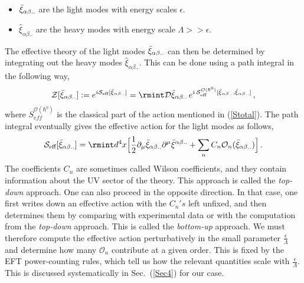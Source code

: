 \begin{itemize}
    \item $\Bar{\xi}_{\alpha\beta..}$ are the light modes with energy scales $\epsilon$.
    \item  $\hat{\xi}_{\alpha\beta..}$ are the heavy modes with energy scale $\Lambda>>\epsilon$.
\end{itemize}
The effective theory of the light modes $\Bar{\xi}_{\alpha\beta..}$ can then be determined by integrating out the heavy modes $\hat{\xi}_{\alpha\beta..}$. This can be done using a path integral in the following way,
\begin{align}
    \begin{split}
    \mathcal{Z}[\Bar{\xi}_{\alpha\beta..}]:=    e^{i\mathcal{S}_{\text{eff}}[\Bar{\xi}_{\alpha\beta..}]}=\rmint \mathcal{D}\hat{\xi}_{\alpha\beta..}\,e^{i\,\mathcal{S}^{\mathcal{O}(\hbar^0)}_{\text{eff}}[\Bar{\xi}_{\alpha\beta..},\hat{\xi}_{\alpha\beta..}]}\,,
        \end{split} \label{stotal1}
\end{align}
where $S^{\mathcal{O}(\hbar^0)}_{eff}$ is the classical part of the action mentioned in (\ref{Stotal}).
The path integral eventually gives the effective action for the light modes as follows,
\begin{align}
    \begin{split}
       \mathcal{S}_{\text{eff}}[\Bar{\xi}_{\alpha\beta..}]= \rmint d^4x\Big[\frac{1}{2}\partial_{\mu}\Bar{\xi}_{\alpha\beta..}\partial^{\mu}\Bar{\xi}^{\alpha\beta..}+
        \sum_{n}C_{n}\mathcal{O}_{n}(\Bar{\xi}_{\alpha\beta..})
\Big]\,.
    \end{split}\label{2.4m}
\end{align}
The coefficients $C_{n}$ are sometimes called Wilson coefficients, and they contain information about the UV sector of the theory. This approach is called the \textit{top-down} approach. One can also proceed in the opposite direction. In that case, one first writes down an effective action with the $C_{n}'s$ left unfixed, and then determines them by comparing with experimental data or with the computation from the \textit{top-down} approach. This is called the \textit{bottom-up} approach. We must therefore compute the effective action perturbatively in the small parameter $\frac{\epsilon}{\Lambda}$ and determine how many $\mathcal{O}_n$ contribute at a given order. This is fixed by the EFT power-counting rules, which tell us how the relevant quantities scale with $\frac{\epsilon}{\Lambda}$. This is discussed systematically in Sec.~(\ref{Sec4}) for our case. \par 
